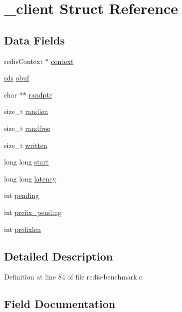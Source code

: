 \hypertarget{struct__client}{}\section{\+\_\+client Struct Reference}
\label{struct__client}
\subsection*{Data Fields}
\begin{DoxyCompactItemize}
\item 
redis\+Context $\ast$ \hyperlink{struct__client_ace869d36dc1b4de4b6d046c0c71486cb}{context}
\item 
\hyperlink{sds_8h_ad69abac3df4532879db9642c95f5ef6f}{sds} \hyperlink{struct__client_af5085d41ae41882aee6dea2f34ce331b}{obuf}
\item 
char $\ast$$\ast$ \hyperlink{struct__client_a12d52dbd99fe44a6384f67bf2c5f4039}{randptr}
\item 
size\+\_\+t \hyperlink{struct__client_a3f7e41f5bca97f81c01a6f1783f39213}{randlen}
\item 
size\+\_\+t \hyperlink{struct__client_a333df7fd0ccc1e7b0a3361c117906f8c}{randfree}
\item 
size\+\_\+t \hyperlink{struct__client_ac7ab1030344ab638a27ba415c914288a}{written}
\item 
long long \hyperlink{struct__client_a9ce58dcdf0248f7daa63c5827931c2bf}{start}
\item 
long long \hyperlink{struct__client_a63aa79bae38bf471f8ca0eb4ebcbc8ed}{latency}
\item 
int \hyperlink{struct__client_a79ec26d453dcd29aec17f5536233e849}{pending}
\item 
int \hyperlink{struct__client_ab2b94bf3cba7e73e2bc3e4a19ce3d713}{prefix\+\_\+pending}
\item 
int \hyperlink{struct__client_ac83d9308bd3c867fa039482a748e3786}{prefixlen}
\end{DoxyCompactItemize}


\subsection{Detailed Description}


Definition at line 84 of file redis-\/benchmark.\+c.



\subsection{Field Documentation}
\mbox{\label{struct__client_ace869d36dc1b4de4b6d046c0c71486cb}} 
